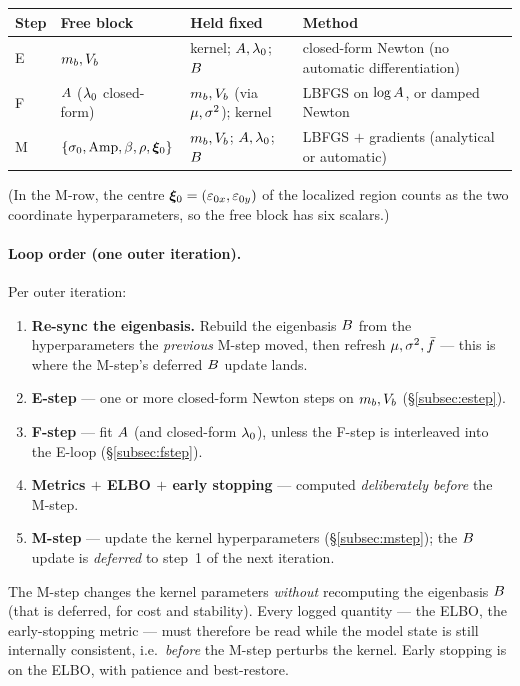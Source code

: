 \begin{center}\small
\begin{tabular}{@{}l l l >{\raggedright\arraybackslash}p{2.35in}@{}}
\toprule
Step & Free block & Held fixed & Method \\
\midrule
E & $m_{b},V_{b}$ & kernel; $A,\lambda_{0}$; $B$ &
    closed-form Newton (no automatic differentiation) \\
F & $A$ ($\lambda_{0}$ closed-form) & $m_{b},V_{b}$ (via $\mu,\sigma^{2}$); kernel &
    LBFGS on $\log A$, or damped Newton \\
M & $\{\sigma_{0},\mathrm{Amp},\beta,\rho,\bm{\xi}_{0}\}$ & $m_{b},V_{b}$; $A,\lambda_{0}$; $B$ &
    LBFGS $+$ gradients (analytical or automatic) \\
\bottomrule
\end{tabular}
\end{center}

\noindent(In the M-row, the centre $\bm{\xi}_{0}=(\varepsilon_{0x},\varepsilon_{0y})$ of
the localized region counts as the two coordinate hyperparameters, so the free
block has six scalars.)

\paragraph{Loop order (one outer iteration).}
Per outer iteration:

\begin{enumerate}[leftmargin=2.4em,itemsep=1pt]
  \item \textbf{Re-sync the eigenbasis.} Rebuild the eigenbasis $B$ from the
        hyperparameters the \emph{previous} M-step moved, then refresh
        $\mu,\sigma^{2},\bar{f}$ --- this is where the M-step's deferred $B$ update
        lands.
  \item \textbf{E-step} --- one or more closed-form Newton steps on
        $m_{b},V_{b}$ (\S\ref{subsec:estep}).
  \item \textbf{F-step} --- fit $A$ (and closed-form $\lambda_{0}$), unless the
        F-step is interleaved into the E-loop (\S\ref{subsec:fstep}).
  \item \textbf{Metrics $+$ ELBO $+$ early stopping} --- computed
        \emph{deliberately before} the M-step.
  \item \textbf{M-step} --- update the kernel hyperparameters
        (\S\ref{subsec:mstep}); the $B$ update is \emph{deferred} to step~1 of
        the next iteration.
\end{enumerate}

\begin{remark}
The M-step changes the kernel parameters \emph{without} recomputing the
eigenbasis $B$ (that is deferred, for cost and stability). Every logged
quantity --- the ELBO, the early-stopping metric --- must therefore be read while
the model state is still internally consistent, i.e.\ \emph{before} the M-step
perturbs the kernel. Early stopping is on the ELBO, with patience and
best-restore.
\end{remark}


